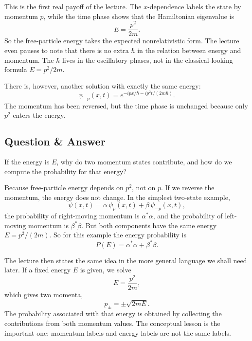 This is the first real payoff of the lecture. The \(x\)-dependence labels the state by momentum \(p\), while the time phase shows that the Hamiltonian eigenvalue is
\begin{equation}
E=\frac{p^2}{2m}.
\end{equation}
So the free-particle energy takes the expected nonrelativistic form. The lecture even pauses to note that there is no extra \(\hbar\) in the relation between energy and momentum. The \(\hbar\) lives in the oscillatory phases, not in the classical-looking formula \(E=p^2/2m\).

There is, however, another solution with exactly the same energy:
\begin{equation}
\psi_{-p}(x,t)
=
e^{-ipx/\hbar - i p^2 t/(2m\hbar)}.
\end{equation}
The momentum has been reversed, but the time phase is unchanged because only \(p^2\) enters the energy.

\subsection{Question \& Answer}

If the energy is \(E\), why do two momentum states contribute, and how do we compute the probability for that energy?

Because free-particle energy depends on \(p^2\), not on \(p\). If we reverse the momentum, the energy does not change. In the simplest two-state example,
\begin{equation}
\psi(x,t)=\alpha\,\psi_p(x,t)+\beta\,\psi_{-p}(x,t),
\end{equation}
the probability of right-moving momentum is \(\alpha^*\alpha\), and the probability of left-moving momentum is \(\beta^*\beta\). But both components have the same energy \(E=p^2/(2m)\). So for this example the energy probability is
\begin{equation}
P(E)=\alpha^*\alpha+\beta^*\beta.
\end{equation}

The lecture then states the same idea in the more general language we shall need later. If a fixed energy \(E\) is given, we solve
\begin{equation}
E=\frac{p^2}{2m},
\end{equation}
which gives two momenta,
\begin{equation}
p_\pm=\pm\sqrt{2mE}.
\end{equation}
The probability associated with that energy is obtained by collecting the contributions from both momentum values. The conceptual lesson is the important one: momentum labels and energy labels are not the same labels.

